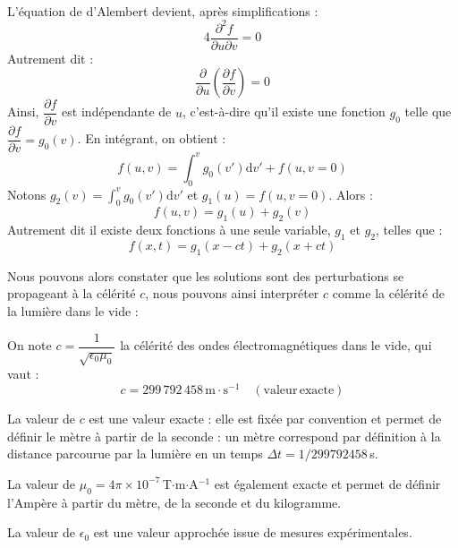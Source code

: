 \documentclass[11pt,fleqn]{book} %
\newcommand{\dd}{\mathrm{d}}
\begin{document}
\begin{demonstration}
\begin{align}
	\end{align}
	L'équation de d'Alembert devient, après simplifications :
	\begin{equation}
		4 \frac{\partial^2 f}{\partial u \partial v} = 0
	\end{equation}
	Autrement dit :
	\begin{equation}
		\frac{\partial}{\partial u} \left( \frac{\partial f}{\partial v}\right) = 0
	\end{equation}
	Ainsi, $\dfrac{\partial f}{\partial v}$ est indépendante de $u$, c'est-à-dire qu'il existe une fonction $g_0$ telle que $\dfrac{\partial f}{\partial v} = g_0(v)$. En intégrant, on obtient :
	\begin{equation}
		f(u,v) = \int_0^v g_0(v') \dd v' + f(u,v=0)
	\end{equation}
	Notons $g_2(v) = \int_0^v g_0(v') \dd v'$ et $g_1(u) = f(u,v=0)$. Alors :
	\begin{equation}
		f(u,v) = g_1(u) + g_2(v)
	\end{equation}
	Autrement dit il existe deux fonctions à une seule variable, $g_1$ et $g_2$, telles que :
	\begin{equation}
		f(x,t) = g_1(x-ct) + g_2(x+ct)
	\end{equation}
\end{demonstration}

Nous pouvons alors constater que les solutions sont des perturbations se propageant à la célérité $c$, nous pouvons ainsi interpréter $c$ comme la célérité de la lumière dans le vide :
\begin{definition}
	On note $c = \dfrac{1}{\sqrt{\epsilon_0 \mu_0}}$ la célérité des ondes électromagnétiques dans le vide, qui vaut :
	\begin{equation}
		c = 299\,792\,458\,\mathrm{m}\cdot\mathrm{s}^{-1} \quad \mathrm{(valeur\,exacte)}
	\end{equation}
\end{definition}

\begin{remark}
	La valeur de $c$ est une valeur exacte : elle est fixée par convention et permet de définir le mètre à partir de la seconde : un mètre correspond par définition à la distance parcourue par la lumière en un temps $\Delta t = 1/299792458$\,s. 

	La valeur de $\mu_0 = 4 \pi \times 10^{-7}$\,T$\cdot$m$\cdot$A$^{-1}$ est également exacte et permet de définir l'Ampère à partir du mètre, de la seconde et du kilogramme.

	La valeur de $\epsilon_0$ est une valeur approchée issue de mesures expérimentales.
\end{remark}
\end{document}

